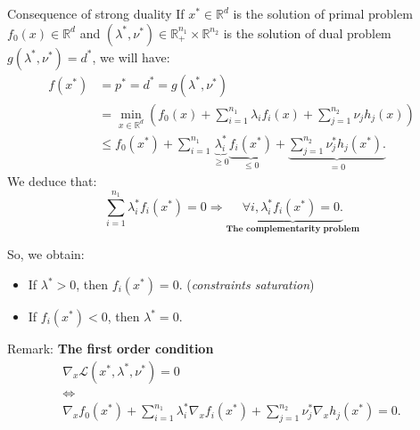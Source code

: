 \documentclass[unknownkeysallowed]{beamer}
\begin{document}
\begin{frame}{Consequence of strong duality}
        If $x^* \in \mathbb{R}^d$ is the solution of primal problem $f_0(x)\in\mathbb{R}^d$ and $(\lambda^*,\nu^*) \in \mathbb{R}_{+}^{n_1} \times \mathbb{R}^{n_2}$ is the solution of dual problem $g(\lambda^*,\nu^*)=d^*$, we will have:
        \begin{align*}
            f(x^*) &= p^* = d^* = g(\lambda^*,\nu^*) \\
                   &= \min_{x\in\mathbb{R}^d} (f_0 (x) + \sum_{i=1}^{n_1} \lambda_i f_i(x) + \sum_{j=1}^{n_2} \nu_j h_j(x)) \\
                   &\leq f_0 (x^*) + \sum_{i=1}^{n_1} \underbrace{\lambda_i^*}_{\geq 0} \underbrace{f_i(x^*)}_{\leq 0} + \underbrace{\sum_{j=1}^{n_2} \nu_j^* h_j(x^*).}_{=0}
        \end{align*}
        We deduce that: 
        $$
        \sum_{i=1}^{n_1} \lambda_i^* f_i(x^*) = 0 \Longrightarrow  \underbrace{\forall i, \lambda_i^* f_i(x^*) = 0.}_{\textbf{The complementarity problem}}
        $$
\end{frame}
\begin{frame}
  So, we obtain:
   \begin{itemize}
        \item If $\lambda^* > 0$, then $f_i(x^*) = 0$. (\textit{constraints saturation})
        \item If $f_i(x^*) < 0$, then $\lambda^* = 0$.
    \end{itemize}
   
    \vspace{1cm}
    \begin{block}{Remark: \textbf{The first order condition}}
        \begin{gather*}
            \nabla_x \mathcal{L} (x^*, \lambda^*, \nu^*) = 0 \\
            \Longleftrightarrow \\
            \nabla_x f_0 (x^*) + \sum_{i=1}^{n_1} \lambda_i^* \nabla_x f_i(x^*) + \sum_{j=1}^{n_2} \nu_j^* \nabla_x h_j(x^*) = 0.
        \end{gather*}
        
   \end{block}
\end{frame}
\end{document}
